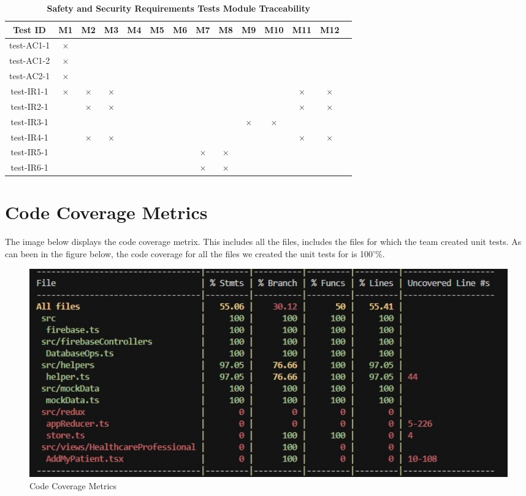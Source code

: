 \documentclass[12pt, titlepage]{article}
\begin{document}
\begin{landscape}
\begin{table} [H]
  \centering
  \begin{tabular}{|c|c|c|c|c|c|c|c|c|c|c|c|c|c|}
  \hline
  Test ID & M1 & M2 & M3 & M4 & M5 & M6 & M7 & M8 & M9 & M10 & M11 & M12 \\
  \hline
  test-AC1-1 & $\times$ & & & & & & & & & & & \\
  \hline
  test-AC1-2 & $\times$ & & & & & & & & & & & \\
  \hline
  test-AC2-1 & $\times$ & & & & & & & & & & & \\
  \hline
  test-IR1-1 & $\times$ & $\times$ & $\times$ & & & & & & & & $\times$ & $\times$\\
  \hline
  test-IR2-1 & & $\times$ & $\times$ & & & & & & & & $\times$ & $\times$\\
  \hline
  test-IR3-1 & & & & & & & & & $\times$ & $\times$ & &\\
  \hline
  test-IR4-1 & & $\times$ & $\times$ & & & & & & & & $\times$ & $\times$\\
  \hline
  test-IR5-1 & & & & & & & $\times$ & $\times$ & & & &\\
  \hline
  test-IR6-1 & & & & & & & $\times$ & $\times$ & & & &\\
  \hline
\end{tabular}
\caption{\bf Safety and Security Requirements Tests Module Traceability} \label{tab:sns-test-traceability}
\end{table}

\end{landscape}
\newpage

\section{Code Coverage Metrics}

The image below displays the code coverage metrix. This includes all the files, includes the files for which the team created unit tests. As can been in the figure below, the code coverage for all the files we created the unit tests for is 100'\%.

\begin{figure}[h]
  \centering
  \includegraphics[width=1\textwidth]{code_coverage_metrics.jpg}
  \caption{Code Coverage Metrics}
\end{figure}
\end{document}

